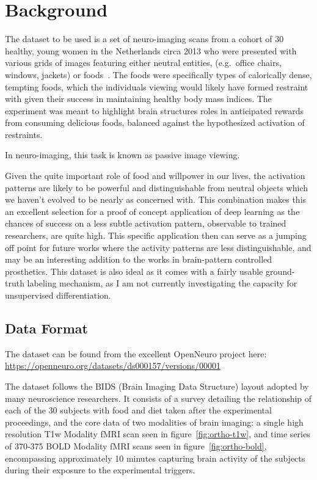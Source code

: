 \usepackage{graphicx}

\section{Background}\label{sec:background}

The dataset to be used is a set of neuro-imaging scans from a cohort of 30 healthy, young women in the
Netherlands circa 2013 who were presented with various grids of images featuring
either neutral entities, (e.g.\ office chairs, windows, jackets) or foods~\cite{smeets2013allured}.
The foods were specifically types of calorically dense, tempting foods, which the individuals viewing would likely
have formed restraint with given their success in maintaining healthy body mass indices.
The experiment was meant to highlight brain structures roles in anticipated rewards from consuming delicious foods,
balanced against the hypothesized activation of restraints.

In neuro-imaging, this task is known as passive image viewing.

Given the quite important role of food and willpower in our lives, the activation patterns are likely to be powerful
and distinguishable from neutral objects which we haven't evolved to be nearly as concerned with.
This combination makes this an excellent selection for a proof of concept application of deep learning as the chances
of success on a less subtle activation pattern, observable to trained researchers, are quite high.
This specific application then can serve as a jumping off point for future works where the activity patterns are less
distinguishable, and may be an interesting addition to the works in brain-pattern controlled prosthetics.
This dataset is also ideal as it comes with a fairly usable ground-truth labeling mechanism, as I am not currently
investigating the capacity for unsupervised differentiation.

\subsection{Data Format}\label{subsec:data-format}

The dataset can be found from the excellent
OpenNeuro project here: \url{https://openneuro.org/datasets/ds000157/versions/00001}

The dataset follows the BIDS (Brain Imaging Data Structure) layout adopted by many neuroscience researchers.
It consists of a survey detailing the relationship of each of the 30 subjects with food and diet taken after the experimental
proceedings, and the core data of two modalities of brain imaging: a single high resolution T1w Modality fMRI scan seen in figure~\ref{fig:ortho-t1w},
and time series of 370-375 BOLD Modality fMRI scans seen in figure~\ref{fig:ortho-bold}, encompassing approximately 10 minutes
capturing brain activity of the subjects during their exposure to the experimental triggers.

